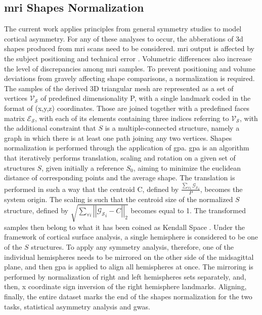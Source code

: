 \subsection{\Ac{mri} Shapes Normalization}\label{subsec:shape_normalization}
The current work applies principles from general symmetry studies to model cortical asymmetry. For any of these analyses to occur, the abberations of \ac{3d} shapes produced from \ac{mri} scans need to be considered. \Ac{mri} output is affected by the subject positioning and technical error \cite{Wittens2021}.  Volumetric differences also increase the level of discrepancies among \ac{mri} samples.  To prevent positioning and volume deviations from gravely affecting shape comparisons, a normalization is required\cite{Klingenberg2020}. The samples of the derived 3D triangular mesh are represented as a set of vertices $\mathcal{V_S}$ of predefined dimensionality P, with a single landmark coded in the format of (x,y,z) coordinates. Those are joined together with a predefined faces matrix $\mathcal{E_S}$, with each of its elements containing three indices referring to $\mathcal{V_S}$, with the additional constraint that $S$ is a multiple-connected structure, namely a graph in which there is at least one path joining any two vertices. Shapes normalization is performed through the application of \ac{gpa}. \Ac{gpa} is an algorithm that iteratively performs translation, scaling and rotation on a given set of structures $S$, given initially a reference $S_0$, aiming to minimize the euclidean distance of corresponding points and the average shape. The translation is performed in such a way that the centroid C, defined by $\frac{\sum_{\forall i}{\mathcal{G_S}}_i}{P}$, becomes the system origin. The scaling is such that the centroid size of the normalized $S$ structure, defined by $\sqrt{\sum_{\forall i}{\left|\left|{\mathcal{G_S}}_i-C\right|\right|_2}}$ becomes equal to 1. The transformed samples then belong to what it has been coined as Kendall Space \cite{Klingenberg2020}.  Under the framework of cortical surface analysis, a single hemisphere is considered to be one of the $S$ structures. To apply any symmetry analysis, therefore, one of the individual hemispheres needs to be mirrored on the other side of the midsagittal plane, and then \ac{gpa} is applied to align all hemispheres at once. The mirroring is performed by normalization of right and left hemispheres sets separately, and, then, x coordinate sign inversion of the right hemisphere landmarks. Aligning, finally, the entire dataset marks the end of the shapes normalization for the two tasks, statistical asymmetry analysis and \ac{gwas}.

